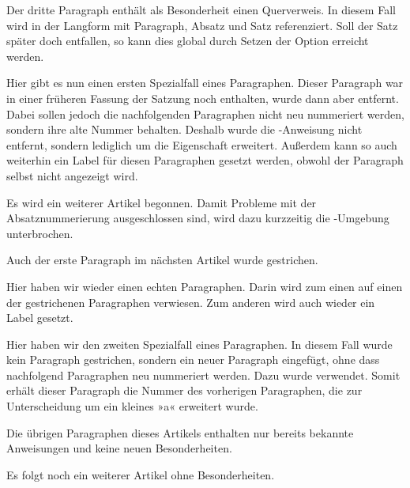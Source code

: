 %
Der dritte Paragraph enthält als Besonderheit einen Querverweis. In diesem
Fall wird in der Langform mit Paragraph, Absatz und Satz referenziert. Soll
der Satz später doch entfallen, so kann dies global durch Setzen der Option
 erreicht werden.

%
Hier gibt es nun einen ersten Spezialfall eines Paragraphen. Dieser Paragraph
war in einer früheren Fassung der Satzung noch enthalten, wurde dann aber
entfernt. Dabei sollen jedoch die nachfolgenden Paragraphen nicht neu
nummeriert werden, sondern ihre alte Nummer behalten. Deshalb wurde die
-Anweisung nicht entfernt, sondern lediglich um
die Eigenschaft  erweitert. Außerdem kann so auch weiterhin ein
Label für diesen Paragraphen gesetzt werden, obwohl der Paragraph selbst nicht
angezeigt wird.

%
Es wird ein weiterer Artikel begonnen. Damit Probleme mit der
Absatznummerierung ausgeschlossen sind, wird dazu kurzzeitig die
-Umgebung unterbrochen.

%
Auch der erste Paragraph im nächsten Artikel wurde gestrichen.

%
Hier haben wir wieder einen echten Paragraphen. Darin wird zum einen auf einen
der gestrichenen Paragraphen verwiesen. Zum anderen wird auch wieder ein Label
gesetzt.

%
Hier haben wir den zweiten Spezialfall eines Paragraphen. In diesem Fall wurde
kein Paragraph gestrichen, sondern ein neuer Paragraph eingefügt, ohne dass
nachfolgend Paragraphen neu nummeriert werden. Dazu wurde
 verwendet. Somit erhält dieser Paragraph
die Nummer des vorherigen Paragraphen, die zur Unterscheidung um ein kleines
»a« erweitert wurde.

%
Die übrigen Paragraphen dieses Artikels enthalten nur bereits bekannte
Anweisungen und keine neuen Besonderheiten.

%
Es folgt noch ein weiterer Artikel ohne Besonderheiten.

